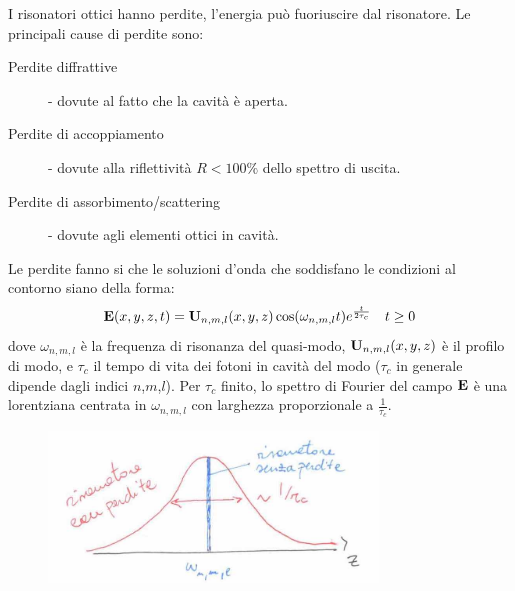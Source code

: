I risonatori ottici hanno perdite, l'energia può fuoriuscire dal risonatore. Le principali cause di perdite sono:
\begin{description}
\item [Perdite diffrattive] - dovute al fatto che la cavità è aperta.
\item [Perdite di accoppiamento] - dovute alla riflettività $R < 100\%$ dello spettro di uscita.
\item [Perdite di assorbimento/scattering] - dovute agli elementi ottici in cavità.
\end{description}
Le perdite fanno si che le soluzioni d'onda che soddisfano le condizioni al contorno siano della forma:
\begin{equation*}
\mathbf{E}(x,y,z,t) = \mathbf{U}_{n,m,l}(x,y,z) \cos(\omega_{n,m,l} t) e^{\frac{t}{2\tau_c}} \quad t \geq 0
\end{equation*}
dove $\omega_{n,m,l}$ è la frequenza di risonanza del quasi-modo, $\mathbf{U}_{n,m,l}(x,y,z)$ è il profilo di modo, e $\tau_c$ il tempo di vita dei fotoni in cavità del modo ($\tau_c$ in generale dipende dagli indici $n$,$m$,$l$).
Per $\tau_c$ finito, lo spettro di Fourier del campo $\mathbf{E}$ è una lorentziana centrata in $\omega_{n,m,l}$ con larghezza proporzionale a $\frac{1}{\tau_c}$.
\begin{figure}[H]
\centering
\includegraphics[height=4cm]{images/10}
\end{figure}
\noindent
